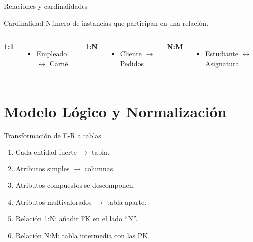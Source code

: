 \documentclass[aspectratio=169, 10pt, xcolor=table]{beamer}
\begin{document}
\begin{frame}{Relaciones y cardinalidades}
    \begin{block}{Cardinalidad}
        Número de instancias que participan en una relación.
    \end{block}
    \begin{columns}[t]
        \textbf{1:1}
        \begin{itemize}
            \item Empleado $\leftrightarrow$ Carné
        \end{itemize}
        \textbf{1:N}
        \begin{itemize}
            \item Cliente $\rightarrow$ Pedidos
        \end{itemize}
        \textbf{N:M}
        \begin{itemize}
            \item Estudiante $\leftrightarrow$ Asignatura
        \end{itemize}
    \end{columns}
    \vspace{0.3cm}
    \centering
\end{frame}

\section{Modelo Lógico y Normalización}

\begin{frame}{Transformación de E-R a tablas}
    \begin{enumerate}
        \item Cada entidad fuerte $\rightarrow$ tabla.
        \item Atributos simples $\rightarrow$ columnas.
        \item Atributos compuestos se descomponen.
        \item Atributos multivalorados $\rightarrow$ tabla aparte.
        \item Relación 1:N: añadir FK en el lado ``N''.
        \item Relación N:M: tabla intermedia con las PK.
    \end{enumerate}
\end{frame}
\end{document}
